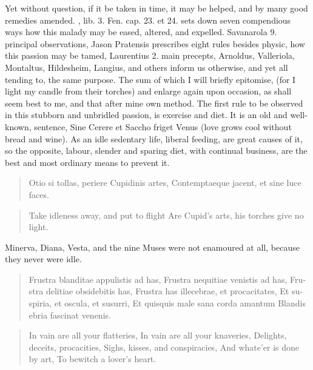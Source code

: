 Yet without question, if it be taken in time, it may be helped, and by
many good remedies amended. \Avicenna{}, lib. 3. Fen. cap. 23. et 24. sets
down seven compendious ways how this malady may be eased, altered, and
expelled. Savanarola 9. principal observations, Jason Pratensis
prescribes eight rules besides physic, how this passion may be tamed,
Laurentius 2. main precepts, Arnoldus, Valleriola, Montaltus,
Hildesheim, Langius, and others inform us otherwise, and yet all
tending to, the same purpose. The sum of which I will briefly
epitomise, (for I light my candle from their torches) and enlarge again
upon occasion, as shall seem best to me, and that after mine own
method. The first rule to be observed in this stubborn and unbridled
passion, is exercise and diet. It is an old and well-known, sentence,
Sine Cerere et Saccho friget Venus (love grows cool without bread and
wine). As an idle sedentary life, liberal feeding, are great
causes of it, so the opposite, labour, slender and sparing diet, with
continual business, are the best and most ordinary means to prevent it.

\begin{latin}
\begin{verse}
Otio si tollas, periere Cupidinis artes,
Contemptaeque jacent, et sine luce faces.
\end{verse}
\end{latin}
\translationrule%
\begin{verse}%
Take idleness away, and put to flight
Are Cupid's arts, his torches give no light.
\end{verse}%

Minerva, Diana, Vesta, and the nine Muses were not enamoured at all,
because they never were idle.

\begin{latin}
\begin{verse}
Frustra blanditae appulistis ad has,
Frustra nequitiae venistis ad has,
Frustra delitiae obsidebitis has,
Frustra has illecebrae, et procacitates,
Et suspiria, et oscula, et susurri,
Et quisquis male sana corda amantum
Blandis ebria fascinat venenis.
\end{verse}
\end{latin}
\translationrule%
\begin{verse}%
In vain are all your flatteries,
In vain are all your knaveries,
Delights, deceits, procacities,
Sighs, kisses, and conspiracies,
And whate'er is done by art,
To bewitch a lover's heart.
\end{verse}%

